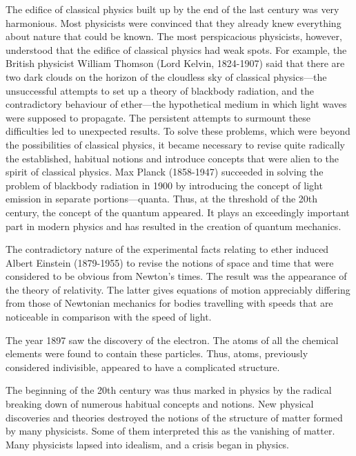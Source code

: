 The edifice of classical physics built up by the end of the last century was very harmonious. Most physicists were convinced that they already knew everything about nature that could be known. The most perspicacious physicists, however, understood that the edifice of classical physics had weak spots. For example, the British physicist William Thomson (Lord Kelvin, 1824-1907) said that there are two dark clouds on the horizon of the cloudless sky of classical physics---the unsuccessful attempts to set up a theory of blackbody radiation, and the contradictory behaviour of ether---the hypothetical medium in which light waves were supposed to propagate. The persistent attempts to surmount these difficulties led to unexpected results. To solve these problems, which were beyond the possibilities of classical physics, it became necessary to revise quite radically the established, habitual notions and introduce concepts that were alien to the spirit of classical physics. Max Planck (1858-1947) succeeded in solving the problem of blackbody radiation in 1900 by introducing the concept of light emission in separate portions---quanta. Thus, at the threshold of the 20th century, the concept of the quantum appeared. It plays an exceedingly important part in modern physics and has resulted in the creation of quantum mechanics. 

The contradictory nature of the experimental facts relating to ether induced Albert Einstein (1879-1955) to revise the notions of space and time that were considered to be obvious from Newton's times. The result was the appearance of the theory of relativity. The latter gives equations of motion appreciably differing from those of Newtonian mechanics for bodies travelling with speeds that are noticeable in comparison with the speed of light.

The year 1897 saw the discovery of the electron. The atoms of all the chemical elements were found to contain these particles. Thus, atoms, previously considered indivisible, appeared to have a complicated structure.

The beginning of the 20th century was thus marked in physics by the radical breaking down of numerous habitual concepts and notions. New physical discoveries and theories destroyed the notions of the structure of matter formed by many physicists. Some of them interpreted this as the vanishing of matter. Many physicists lapsed into idealism, and a crisis began in physics.

